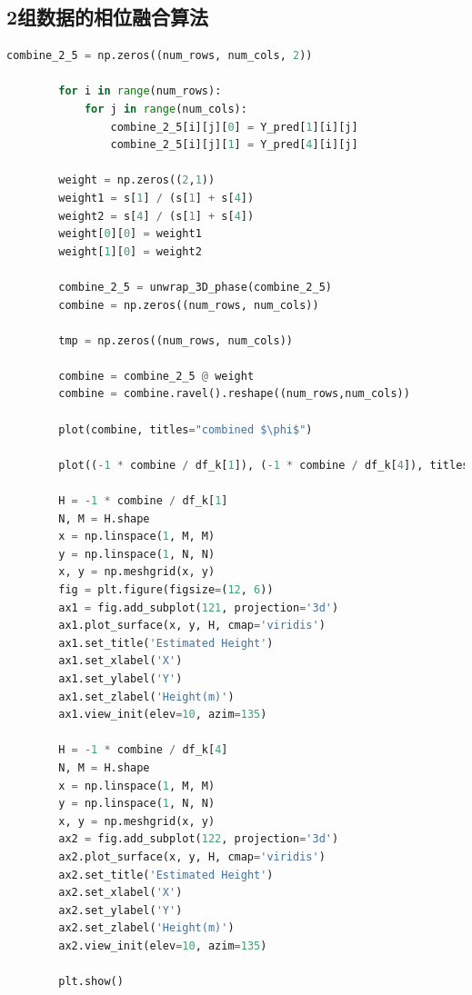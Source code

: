 \documentclass[a4paper]{article}
\begin{document}
	\subsection{2组数据的相位融合算法}
	\begin{lstlisting}[language=python,columns=fullflexible,frame=shadowbox]
		combine_2_5 = np.zeros((num_rows, num_cols, 2))

		for i in range(num_rows):
			for j in range(num_cols):
				combine_2_5[i][j][0] = Y_pred[1][i][j]
				combine_2_5[i][j][1] = Y_pred[4][i][j]
		
		weight = np.zeros((2,1))
		weight1 = s[1] / (s[1] + s[4])
		weight2 = s[4] / (s[1] + s[4])
		weight[0][0] = weight1
		weight[1][0] = weight2
		
		combine_2_5 = unwrap_3D_phase(combine_2_5)
		combine = np.zeros((num_rows, num_cols))
		
		tmp = np.zeros((num_rows, num_cols))
		
		combine = combine_2_5 @ weight		
		combine = combine.ravel().reshape((num_rows,num_cols))
	
		plot(combine, titles="combined $\phi$")
		
		plot((-1 * combine / df_k[1]), (-1 * combine / df_k[4]), titles=["Height 0", "Height 1"])
		
		H = -1 * combine / df_k[1]		
		N, M = H.shape
		x = np.linspace(1, M, M)
		y = np.linspace(1, N, N)
		x, y = np.meshgrid(x, y)
		fig = plt.figure(figsize=(12, 6))
		ax1 = fig.add_subplot(121, projection='3d')
		ax1.plot_surface(x, y, H, cmap='viridis')
		ax1.set_title('Estimated Height')
		ax1.set_xlabel('X')
		ax1.set_ylabel('Y')
		ax1.set_zlabel('Height(m)')
		ax1.view_init(elev=10, azim=135)
		
		H = -1 * combine / df_k[4]	
		N, M = H.shape
		x = np.linspace(1, M, M)
		y = np.linspace(1, N, N)
		x, y = np.meshgrid(x, y)
		ax2 = fig.add_subplot(122, projection='3d')
		ax2.plot_surface(x, y, H, cmap='viridis')
		ax2.set_title('Estimated Height')
		ax2.set_xlabel('X')
		ax2.set_ylabel('Y')
		ax2.set_zlabel('Height(m)')
		ax2.view_init(elev=10, azim=135)
		
		plt.show()		
	\end{lstlisting}
\end{document}
